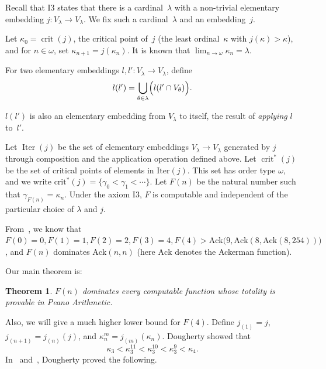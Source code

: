 \documentclass{article}
\newtheorem{theorem}[lemma]{Theorem}
\theoremstyle{definition}
\theoremstyle{remark}
\DeclareMathOperator{\crit}{crit}
\DeclareMathOperator{\Iter}{Iter}
\begin{document}
Recall that I3 states that there is a cardinal~$\lambda$ with a non-trivial elementary embedding \(j\colon V_\lambda\to V_\lambda\). We fix such a cardinal~\(\lambda\) and an embedding~\(j\). 

Let \(\kappa_0 = \crit(j)\), the critical point of~$j$ (the least ordinal~$\kappa$ with $j(\kappa)>\kappa$), and for \(n \in \omega\), set \(\kappa_{n+1} = j(\kappa_n)\). It is known that \(\lim_{n \to \omega} \kappa_{n} = \lambda\).


For two elementary embeddings \( l, l' : V_\lambda \to V_\lambda\), define
\[
l(l') = \bigcup_{\theta \in \lambda} \Bigl(l(l' \cap V_\theta)\Bigr).
\]

$l(l')$ is also an elementary embedding from $V_\lambda$ to itself, the result of \emph{applying} $l$ to~$l'$.

Let \(\Iter(j)\) be the set of elementary embeddings \(V_\lambda \to V_\lambda\) generated by \(j\) through composition and the application operation defined above. Let \(\crit^*(j)\) be the set of critical points of elements in \(\mathrm{Iter}(j)\). This set has order type \(\omega\), and we write \(\mathrm{crit}^*(j) = \{\gamma_0 < \gamma_1 < \cdots\}\). Let \(F(n)\) be the natural number such that \(\gamma_{F(n)} = \kappa_n\). Under the axiom I3, \(F\) is computable and independent of the particular choice of \(\lambda\) and \(j\).

From~\cite{Dougherty}, we know that $F(0)=0, F(1)=1, F(2)=2, F(3)=4, F(4)>\mathrm{Ack}\bigl(9, \mathrm{Ack}(8, \mathrm{Ack}(8, 254))\bigr)$, and $F(n)$ dominates $\mathrm{Ack}(n,n)$ (here $\mathrm{Ack}$ denotes the Ackerman function).

Our main theorem is:

\begin{theorem} \label{thm:peano_arithmetic}
  $F(n)$ dominates every computable function whose totality is provable in Peano Arithmetic.
\end{theorem}

Also, we will give a much higher lower bound for $F(4)$.
Define \( j_{(1)} = j \), \( j_{(n+1)} = j_{(n)}(j)\), and \(\kappa^m_n = j_{(m)}(\kappa_n)\).
Dougherty showed that 
\[
  \kappa_3 < \kappa_3^{11} < \kappa_3^{10} < \kappa_3^{9} < \kappa_4.
\]
In~\cite{Dougherty} and~\cite{Dougherty2}, Dougherty proved the following.
\end{document}
